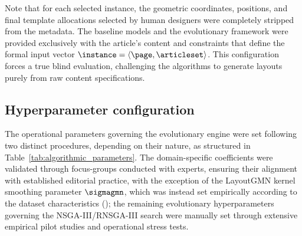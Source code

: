 \begin{callout}
Note that for each selected instance, the geometric coordinates, positions, and final template allocations selected by human designers were completely stripped from the metadata. The baseline models and the evolutionary framework were provided exclusively with the article's content and constraints that define the formal input vector $\instance = \langle \page, \articleset \rangle$.  This configuration forces a true blind evaluation, challenging the algorithms to generate layouts purely from raw content specifications.
\end{callout}



\subsection{Hyperparameter configuration}
\label{subsec:hyperparameter_calibration}

The operational parameters governing the evolutionary engine were set following two distinct procedures, depending on their nature, as structured in Table~\ref{tab:algorithmic_parameters}. The domain-specific coefficients were validated through focus-groups conducted with \melody experts, ensuring their alignment with established editorial practice, with the exception of the LayoutGMN kernel smoothing parameter $\sigmagmn$, which was instead set empirically according to the dataset characteristics (); the remaining evolutionary hyperparameters governing the NSGA-III/RNSGA-III search were manually set through extensive empirical pilot studies and operational stress tests.

